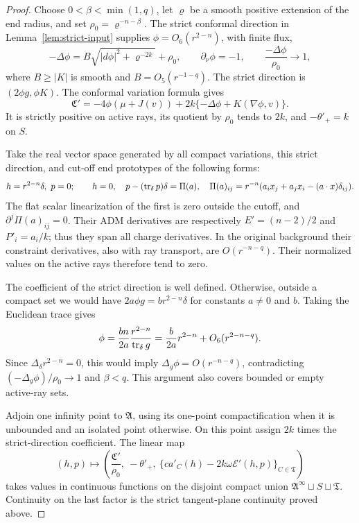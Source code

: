 \begin{proof}
Choose $0<\beta<\min(1,q)$, let $\varrho$ be a smooth positive
extension of the end radius, and set $\rho_0=\varrho^{-n-\beta}$.  The strict conformal direction in Lemma~\ref{lem:strict-input} supplies
$\phi=O_6(r^{2-n})$, with finite flux,
\begin{equation}\label{eq:variation:strict-direction}
 -\Delta\phi=B\sqrt{|d\phi|^2+\varrho^{-2k}}+\rho_0,\qquad
 \partial_\nu\phi=-1,\qquad
 \frac{-\Delta\phi}{\rho_0}\longrightarrow1,
\end{equation}
where $B\ge|K|$ is smooth and $B=O_5(r^{-1-q})$.
The strict direction is $(2\phi g,\phi K)$.  The conformal variation
formula gives
\[
 \mathfrak C'=-4\phi(\mu+J(v))
       +2k\{-\Delta\phi+K(\nabla\phi,v)\}.
\]
It is strictly positive on active rays, its quotient by $\rho_0$ tends
to $2k$, and $-\theta'_+=k$ on $S$.

Take the real vector space generated by all compact variations, this
strict direction, and cut-off end prototypes of the following forms:
\begin{equation}\label{eq:variation:prototypes}
 h=r^{2-n}\delta,\ p=0;\qquad
 h=0,\quad p-(\operatorname{tr}_\delta p)\delta=\Pi(a),\quad
 \Pi(a)_{ij}=r^{-n}(a_ix_j+a_jx_i-(a\cdot x)\delta_{ij}).
\end{equation}
The flat scalar linearization of the first is zero outside the cutoff,
and $\partial^j\Pi(a)_{ij}=0$.  Their ADM derivatives are respectively
$E'=(n-2)/2$ and $P'_i=a_i/k$; thus they span all charge derivatives.
In the original background their constraint derivatives, also with
ray transport, are $O(r^{-n-q})$.  Their normalized values on the
active rays therefore tend to zero.

The coefficient of the strict direction is well defined.  Otherwise,
outside a compact set we would have $2a\phi g=b r^{2-n}\delta$ for
constants $a\ne0$ and $b$.  Taking the Euclidean trace gives
\[
 \phi=\frac{bn}{2a}\frac{r^{2-n}}{\operatorname{tr}_\delta g}
      =\frac b{2a}r^{2-n}+O_6(r^{2-n-q}).
\]
Since $\Delta_\delta r^{2-n}=0$, this would imply
$\Delta_g\phi=O(r^{-n-q})$, contradicting
$(-\Delta_g\phi)/\rho_0\to1$ and $\beta<q$.
This argument also covers bounded or empty active-ray sets.

Adjoin one infinity point to $\mathfrak A$, using its one-point
compactification when it is unbounded and an isolated point otherwise.
On this point assign $2k$ times the strict-direction coefficient.  The
linear map
\begin{equation}\label{eq:variation:separation-map}
 (h,p)\longmapsto
 \left(\frac{\mathfrak C'}{\rho_0},\ -\theta'_+,\
       \{c a'_C(h)-2k\omega\mathcal E'(h,p)\}_{C\in\mathfrak T}\right)
\end{equation}
takes values in continuous functions on the disjoint compact union
$\mathfrak A^\infty\sqcup S\sqcup\mathfrak T$.  Continuity on the last
factor is the strict tangent-plane continuity proved above.


\end{proof}
